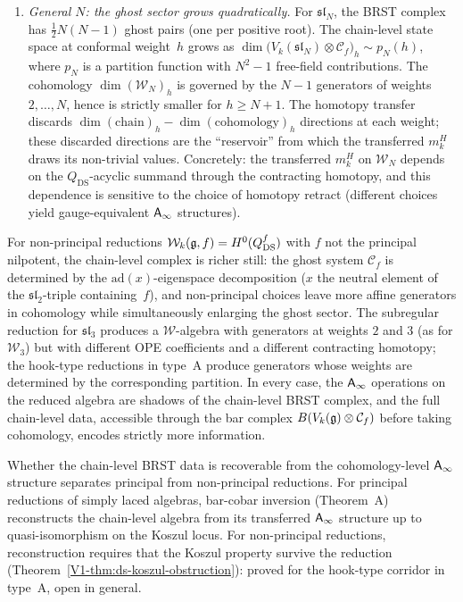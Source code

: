 \begin{remark}
\begin{enumerate}[label=\textup{(\roman*)}]
\item \emph{General $N$: the ghost sector grows
 quadratically.}
 For $\mathfrak{sl}_N$, the BRST complex has
 $\tfrac{1}{2}N(N-1)$ ghost pairs (one per positive root).
 The chain-level state space at conformal weight~$h$
 grows as
 $\dim\bigl(V_k(\mathfrak{sl}_N) \otimes
 \mathcal{C}_f\bigr)_h \sim p_N(h)$,
 where $p_N$ is a partition function with $N^2 - 1$
 free-field contributions. The cohomology
 $\dim(\mathcal{W}_N)_h$ is governed by the $N - 1$
 generators of weights $2, \ldots, N$, hence is
 strictly smaller for $h \geq N + 1$.
 The homotopy transfer discards
 $\dim(\mathrm{chain})_h -
 \dim(\mathrm{cohomology})_h$
 directions at each weight; these discarded directions
 are the ``reservoir'' from which the transferred
 $m_k^H$ draws its non-trivial values. Concretely:
 the transferred $m_k^H$ on $\mathcal{W}_N$ depends on
 the $Q_{\mathrm{DS}}$-acyclic summand through the
 contracting homotopy, and this dependence is sensitive
 to the choice of homotopy retract (different choices
 yield gauge-equivalent $\mathsf{A}_{\infty}$ structures).
\end{enumerate}

For non-principal reductions
$\mathcal{W}_k(\mathfrak{g}, f) = H^0(Q_{\mathrm{DS}}^f)$
with $f$ not the principal nilpotent, the chain-level
complex is richer still: the ghost system
$\mathcal{C}_f$ is determined by the $\mathrm{ad}(x)$-eigenspace
decomposition ($x$ the neutral element of the
$\mathfrak{sl}_2$-triple containing~$f$), and
non-principal choices leave more affine generators in
cohomology while simultaneously enlarging the ghost
sector. The subregular reduction for $\mathfrak{sl}_3$
produces a $\mathcal{W}$-algebra with generators at
weights $2$ and $3$ (as for $\mathcal{W}_3$) but with
different OPE coefficients and a different contracting
homotopy; the hook-type reductions in type~A produce
generators whose weights are determined by the
corresponding partition. In every case, the
$\mathsf{A}_{\infty}$ operations on the reduced algebra are shadows
of the chain-level BRST complex, and the full
chain-level data, accessible through the bar complex
$B(V_k(\mathfrak{g}) \otimes \mathcal{C}_f)$ before taking
cohomology, encodes strictly more information.

Whether the chain-level BRST data is recoverable from the
cohomology-level $\mathsf{A}_{\infty}$ structure separates principal from
non-principal reductions. For principal reductions of simply
laced algebras, bar-cobar inversion (Theorem~A) reconstructs
the chain-level algebra from its transferred $\mathsf{A}_{\infty}$ structure
up to quasi-isomorphism on the Koszul locus. For non-principal
reductions, reconstruction requires that the Koszul property
survive the reduction (Theorem~\ref*{V1-thm:ds-koszul-obstruction}):
proved for the hook-type corridor in type~A, open in general.
\end{remark}



